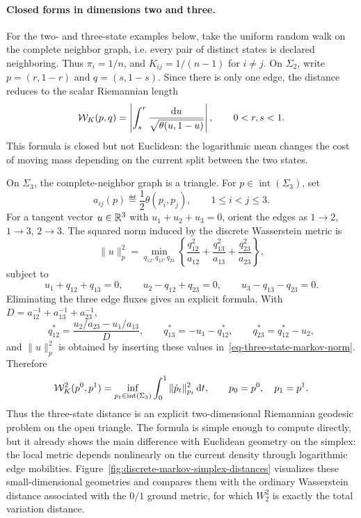 \paragraph{Closed forms in dimensions two and three.}
For the two- and three-state examples below, take the uniform random walk on the complete neighbor graph, i.e. every pair of distinct states is declared neighboring. Thus \(\pi_i=1/n\), and \(K_{ij}=1/(n-1)\) for \(i\neq j\). On \(\Sigma_2\), write \(p=(r,1-r)\) and \(q=(s,1-s)\). Since there is only one edge, the distance reduces to the scalar Riemannian length
\begin{equation}
\label{eq-two-state-markov-distance}
\mathcal W_K(p,q)
=
\left|\int_s^r \frac{\mathrm{d} u}{\sqrt{\theta(u,1-u)}}\right|,
\qquad
0<r,s<1.
\end{equation}
This formula is closed but not Euclidean: the logarithmic mean changes the cost of moving mass depending on the current split between the two states.

On \(\Sigma_3\), the complete-neighbor graph is a triangle. For \(p\in\operatorname{int}(\Sigma_3)\), set
\[
a_{ij}(p)\eqdef\frac12\theta(p_i,p_j),
\qquad 1\leq i<j\leq3.
\]
For a tangent vector \(u\in\mathbb{R}^3\) with \(u_1+u_2+u_3=0\), orient the edges as \(1\to2\), \(1\to3\), \(2\to3\). The squared norm induced by the discrete Wasserstein metric is
\begin{equation}
\label{eq-three-state-markov-norm}
\|u\|_p^2
=
\min_{q_{12},q_{13},q_{23}}
\left\{
\frac{q_{12}^2}{a_{12}}+
\frac{q_{13}^2}{a_{13}}+
\frac{q_{23}^2}{a_{23}}
\right\},
\end{equation}
subject to
\[
u_1+q_{12}+q_{13}=0,
\qquad
u_2-q_{12}+q_{23}=0,
\qquad
u_3-q_{13}-q_{23}=0.
\]
Eliminating the three edge fluxes gives an explicit formula. With \(D=a_{12}^{-1}+a_{13}^{-1}+a_{23}^{-1}\),
\[
q_{12}^*=\frac{u_2/a_{23}-u_1/a_{13}}{D},
\qquad
q_{13}^*=-u_1-q_{12}^*,
\qquad
q_{23}^*=q_{12}^*-u_2,
\]
and \(\|u\|_p^2\) is obtained by inserting these values in~\eqref{eq-three-state-markov-norm}. Therefore
\begin{equation}
\label{eq-three-state-markov-distance}
\mathcal W_K^2(p^0,p^1)
=
\inf_{p_t\in\operatorname{int}(\Sigma_3)}
\int_0^1\|\dot p_t\|_{p_t}^2\,\mathrm{d} t,
\qquad
p_0=p^0,
\quad p_1=p^1.
\end{equation}
Thus the three-state distance is an explicit two-dimensional Riemannian geodesic problem on the open triangle. The formula is simple enough to compute directly, but it already shows the main difference with Euclidean geometry on the simplex: the local metric depends nonlinearly on the current density through logarithmic edge mobilities. Figure~\ref{fig:discrete-markov-simplex-distances} visualizes these small-dimensional geometries and compares them with the ordinary Wasserstein distance associated with the \(0/1\) ground metric, for which \(W_2^2\) is exactly the total variation distance.

